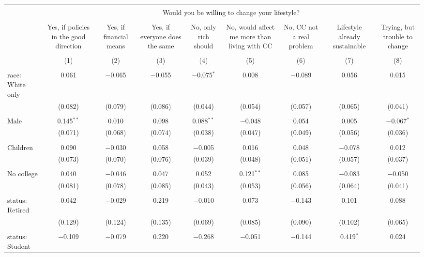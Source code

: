 
\begin{tabular}{@{\extracolsep{5pt}}lcccccccc} 
\\[-1.8ex]\hline 
\hline \\[-1.8ex] 
 & \multicolumn{8}{c}{Would you be willing to change your lifestyle?} \\ 
\cline{2-9} 
\\[-1.8ex] & Yes, if policies in the good direction & Yes, if financial means & Yes, if everyone does the same & No, only rich should & No, would affect me more than living with CC & No, CC not a real problem & Lifestyle already sustainable & Trying, but trouble to change \\ 
\\[-1.8ex] & (1) & (2) & (3) & (4) & (5) & (6) & (7) & (8)\\ 
\hline \\[-1.8ex] 
 race: White only & 0.061 & $-$0.065 & $-$0.055 & $-$0.075$^{*}$ & 0.008 & $-$0.089 & 0.056 & 0.015 \\ 
  & (0.082) & (0.079) & (0.086) & (0.044) & (0.054) & (0.057) & (0.065) & (0.041) \\ 
  & & & & & & & & \\ 
 Male & 0.145$^{**}$ & 0.010 & 0.098 & 0.088$^{**}$ & $-$0.048 & 0.054 & 0.005 & $-$0.067$^{*}$ \\ 
  & (0.071) & (0.068) & (0.074) & (0.038) & (0.047) & (0.049) & (0.056) & (0.036) \\ 
  & & & & & & & & \\ 
 Children & 0.090 & $-$0.030 & 0.058 & $-$0.005 & 0.016 & 0.048 & $-$0.078 & 0.012 \\ 
  & (0.073) & (0.070) & (0.076) & (0.039) & (0.048) & (0.051) & (0.057) & (0.037) \\ 
  & & & & & & & & \\ 
 No college & 0.040 & $-$0.046 & 0.047 & 0.052 & 0.121$^{**}$ & 0.085 & $-$0.083 & $-$0.050 \\ 
  & (0.081) & (0.078) & (0.085) & (0.043) & (0.053) & (0.056) & (0.064) & (0.041) \\ 
  & & & & & & & & \\ 
 status: Retired & 0.042 & $-$0.029 & 0.219 & $-$0.010 & 0.073 & $-$0.143 & 0.101 & 0.088 \\ 
  & (0.129) & (0.124) & (0.135) & (0.069) & (0.085) & (0.090) & (0.102) & (0.065) \\ 
  & & & & & & & & \\ 
 status: Student & $-$0.109 & $-$0.079 & 0.220 & $-$0.268 & $-$0.051 & $-$0.144 & 0.419$^{*}$ & 0.024 \\ 

\end{tabular}
